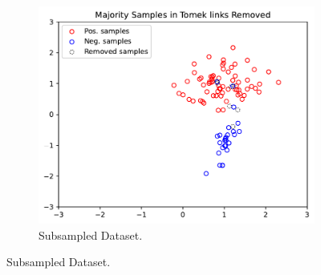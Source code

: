 \documentclass[a4paper]{article}
\begin{document}
{\begin{enumerate}
\begin{figure}[h]
    \hfill
    \begin{subfigure}{0.32\textwidth}
        \centering
        \includegraphics[width=\textwidth]{figures/removed_dataset}
        \caption{Subsampled Dataset.}
    \end{subfigure}
\end{figure}

\end{enumerate}


}
\end{document}
